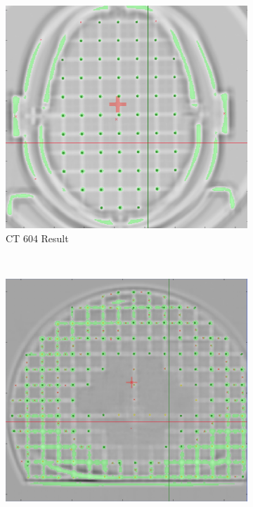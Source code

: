 \documentclass[12pt]{article}
\begin{document}
\begin{figure}
    \centering
    \begin{subfigure}[b]{0.48\textwidth}
        \centering
        \includegraphics[width=\textwidth]{case-001-feature-detection.png}
        \caption{CT 604 Result}
        \label{fig:testing-feature-detection_1}
    \end{subfigure}%
    ~
    \begin{subfigure}[b]{0.48\textwidth}
        \centering
        \includegraphics[width=\textwidth]{case-010-feature-detection.png}

\end{subfigure}
\end{figure}
\end{document}
